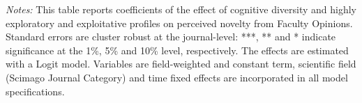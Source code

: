\begin{table}[h!]
{\begin{threeparttable}
\begin{tablenotes}
 \footnotesize
 \justifying \item {\it Notes:}
 This table reports coefficients of the effect of cognitive diversity and highly exploratory and exploitative profiles on perceived novelty from Faculty Opinions. Standard errors are cluster robust at the journal-level: ***, ** and * indicate significance at the 1\%, 5\% and 10\% level, respectively. The effects are estimated with a Logit model. Variables are field-weighted and constant term, scientific field (Scimago Journal Category) and time fixed effects are incorporated in all model specifications.
 \end{tablenotes}
 \end{threeparttable}
 }
\end{table} 